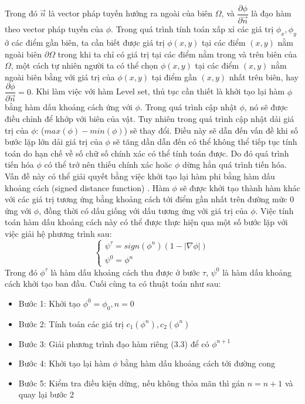 \documentclass[14pt,oneside,a4paper]{extreport}
\begin{document}
Trong đó $\vec{n}$ là vector pháp tuyến hướng ra ngoài của biên $\Omega$, và $\dfrac{\partial \phi}{\partial \vec{n}} $ là đạo hàm theo vector pháp tuyến của $\phi$. Trong quá trình tính toán xấp xỉ các giá trị $\phi_x, \phi_y$ ở các điểm gần biên, ta cần biết được giá trị $\phi(x,y)$ tại các điểm $(x, y)$ nằm ngoài biên $\partial \Omega$ trong khi ta chỉ có giá trị tại các điểm nằm trong và trên biên của $\Omega$, một cách tự nhiên người ta có thể chọn $\phi(x,y)$ tại các điểm $(x, y)$ nằm ngoài biên bằng với giá trị của $\phi(x,y)$ tại điểm gần $(x,y)$  nhất trên biên, hay $\dfrac{\partial \phi}{\partial \vec{n}}=0$. Khi làm việc với hàm Level set, thủ tục cần thiết là khởi tạo lại hàm $\phi$ bằng hàm dấu khoảng cách ứng với $\phi$. Trong quá trình cập nhật $\phi$, nó sẽ được điều chỉnh để khớp với biên của vật. Tuy nhiên trong quá trình cập nhật dải giá trị của $\phi$: ($max(\phi)-min(\phi)$) sẽ thay đổi. Điều này sẽ dẫn đến vấn đề  khi số bước lặp lớn dải giá trị của $\phi$ sẽ tăng dần  dẫn đến có thể không thể tiếp tục tính toán do hạn chế về số chữ số chính xác có thể tính toán được. Do đó quá trình tiến hóa $\phi$ có thể trở nên thiếu chính xác hoăc $\phi$ dừng hẳn quá trình tiến hóa. Vấn đề này có thể giải quyết bằng việc khởi tạo lại hàm phi bằng hàm dấu khoảng cách (signed distance function) . Hàm $\phi$ sẽ được khởi tạo thành hàm khác với các giá trị tương ứng bằng khoảng cách tới điểm gần nhất trên đường mức 0 ứng với $\phi$, đồng thời có dấu giống với dấu tương ứng với giá trị của $\phi$. Việc tính toán hàm dấu khoảng cách này có thể được thực hiện qua một số bước lặp với việc giải hệ phương trình sau:
\begin{equation}
\begin{cases}
 \psi^{\tau}=sign(\phi^n)(1-|\nabla \phi|)\\
 \psi^{0}=\phi^n
   \end{cases}
\end{equation}
 Trong đó $\phi^{\tau}$ là hàm dấu khoảng cách thu được ở bước $\tau$, $\psi^{0}$ là hàm dấu khoảng cách khởi tạo ban đầu. Cuối cùng ta có thuật toán như sau:
\begin{itemize}
\item Bước 1: Khởi tạo $\phi^0=\phi_0, n=0$
\item Bước 2: Tính toán các giá trị $c_1(\phi^n), c_2(\phi^n)$
\item Bước 3: Giải phương trình đạo hàm riêng (3.3) để có $\phi^{n+1}$
\item Bước 4: Khởi tạo lại hàm $\phi$ bằng hàm dấu khoảng cách tới đường cong
\item Bước 5: Kiểm tra điều kiện dừng, nếu không thỏa mãn thì gán $n=n+1$ và quay lại bước 2
\end{itemize}
\end{document}
